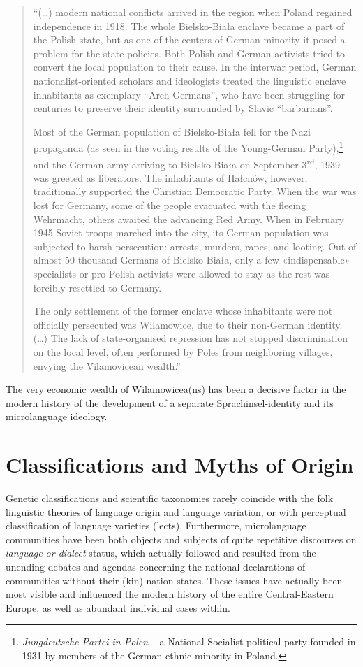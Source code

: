 \documentclass[output=paper]{langscibook}
\begin{document}
\begin{quote}
    ``(\ldots) modern national conflicts arrived in the region when Poland regained independence in 1918. The whole Bielsko-Biała enclave became a part of the Polish state, but as one of the centers of German minority it posed a problem for the state policies. Both Polish and German activists tried to convert the local population to their cause. In the interwar period, German nationalist-oriented scholars and ideologists treated the linguistic enclave inhabitants as exemplary ``Arch-Germans'', who have been struggling for centuries to preserve their identity surrounded by Slavic ``barbarians''.
    
    Most of the German population of Bielsko-Biała fell for the Nazi propaganda (as seen in the voting results of the Young-German Party),\footnote{\textit{Jungdeutsche Partei in Polen} -- a National Socialist political party founded in 1931 by members of the German ethnic minority in Poland.} and the German army arriving to Bielsko-Biała on September 3\textsuperscript{rd}, 1939 was greeted as liberators. The inhabitants of Hałcnów, however, traditionally supported the Christian Democratic Party. When the war was lost for Germany, some of the people evacuated with the fleeing Wehrmacht, others awaited the advancing Red Army. When in February 1945 Soviet troops marched into the city, its German population was subjected to harsh persecution: arrests, murders, rapes, and looting. Out of almost 50 thousand Germans of Bielsko-Biała, only a few «indispensable» specialists or pro-Polish activists were allowed to stay as the rest was forcibly resettled to Germany.
    
    The only settlement of the former enclave whose inhabitants were not officially persecuted was Wilamowice, due to their non-German identity. (\ldots) The lack of state-organised repression has not stopped discrimination on the local level, often performed by Poles from neighboring villages, envying the Vilamovicean wealth.''
\end{quote}

The very economic wealth of Wilamowicea(ns) has been a decisive factor in the modern history of the development of a separate Sprachinsel-identity and its microlanguage ideology.

\section{Classifications and Myths of Origin}
Genetic classifications and scientific taxonomies rarely coincide with the folk linguistic theories of language origin and language variation, or with perceptual classification of language varieties (lects). Furthermore, microlanguage communities have been both objects and subjects of quite repetitive discourses on \textit{language-or-dialect} status, which actually followed and resulted from the unending debates and agendas concerning the national declarations of communities without their (kin) nation-states. These issues have actually been most visible and influenced the modern history of the entire Central-Eastern Europe, as well as abundant individual cases within.
\end{document}
